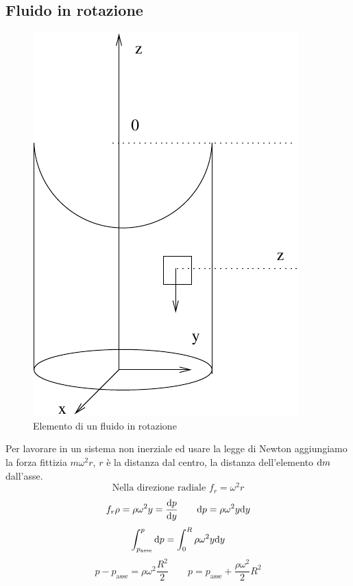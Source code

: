 \subsection{Fluido in rotazione}
\begin{figure}[htbp]
\centering
\includegraphics[scale=0.65]{immagini/fisica1/fluido_rotazione}
\caption{Elemento di un fluido in rotazione}
\end{figure}
Per lavorare in un sistema non inerziale ed usare la legge di Newton aggiungiamo la forza fittizia $m\omega^2 r$, $r$ è la distanza dal centro, la distanza dell'elemento $\mathrm{d} m$ dall'asse.
\begin{equation*}\text{Nella direzione radiale } f_r=\omega^2 r\end{equation*}
\begin{equation*}f_r\rho=\rho\omega^2 y=\frac{\mathrm{d} p}{\mathrm{d} y}\qquad \mathrm{d} p=\rho\omega^2 y\mathrm{d} y\end{equation*}
\begin{equation*}\int_{p_\text{asse}}^p\mathrm{d} p=\int_0^R \rho\omega^2 y\mathrm{d} y\end{equation*}
\begin{equation*}p-p_\text{asse}=\rho\omega^2\frac{R^2}{2}\qquad p=p_\text{asse}+\frac{\rho\omega^2}{2}R^2\end{equation*}
